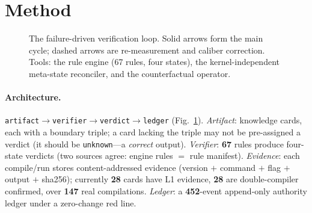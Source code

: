 \documentclass{article}
\begin{document}
\section{Method}
\label{sec:method}
\begin{figure}[t]
\centering
{}
\caption{The failure-driven verification loop. Solid arrows form the main cycle; dashed arrows
are re-measurement and caliber correction. Tools: the rule engine (67 rules, four states), the
kernel-independent meta-state reconciler, and the counterfactual operator.}
\label{fig:loop}
\end{figure}

\paragraph{Architecture.}
\texttt{artifact}$\to$\texttt{verifier}$\to$\texttt{verdict}$\to$\texttt{ledger} (Fig.~\ref{fig:loop}).
\emph{Artifact}: knowledge cards, each with a boundary triple; a card lacking the triple may not
be pre-assigned a verdict (it should be \texttt{unknown}---a \emph{correct} output).
\emph{Verifier}: \textbf{67} rules produce four-state verdicts (two sources agree: engine rules
$=$ rule manifest). \emph{Evidence}: each compile/run stores content-addressed evidence (version
$+$ command $+$ flag $+$ output $+$ sha256); currently \textbf{28} cards have L1 evidence,
\textbf{28} are double-compiler confirmed, over \textbf{147} real compilations. \emph{Ledger}: a
\textbf{452}-event append-only authority ledger under a zero-change red line.
\end{document}
